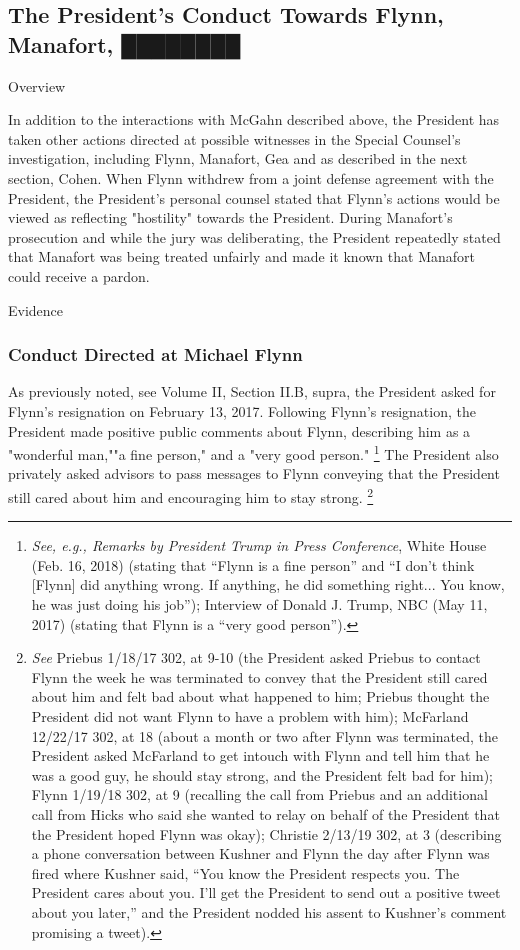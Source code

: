 \subsection{The President's Conduct Towards Flynn, Manafort, ████████}

Overview

In addition to the interactions with McGahn described above, the President has taken other actions directed at possible witnesses in the Special Counsel's investigation, including Flynn, Manafort, Gea and as described in the next section, Cohen.
When Flynn withdrew from a joint defense agreement with the President, the President's personal counsel stated that Flynn's actions would be viewed as reflecting "hostility" towards the President.
During Manafort's prosecution and while the jury was deliberating, the President repeatedly stated that Manafort was being treated unfairly and made it known that Manafort could receive a pardon.

Evidence

\subsubsection{Conduct Directed at Michael Flynn}

As previously noted, see Volume II, Section II.B, supra, the President asked for Flynn's resignation on February 13, 2017.
Following Flynn's resignation, the President made positive public comments about Flynn, describing him as a "wonderful man,""a fine person," and a "very good person."%
\footnote{\textit{See, e.g., Remarks by President Trump in Press Conference}, White House (Feb. 16, 2018) (stating that “Flynn is a fine person” and “I don’t think [Flynn] did anything wrong.
If anything, he did something right... You know, he was just doing his job”);
Interview of Donald J. Trump, NBC (May 11, 2017) (stating that Flynn is a “very good person”).}
The President also privately asked advisors to pass messages to Flynn conveying that the President still cared about him and encouraging him to stay strong.%
\footnote{\textit{See} Priebus 1/18/17 302, at 9-10 (the President asked Priebus to contact Flynn the week he was terminated to convey that the President still cared about him and felt bad about what happened to him;
Priebus thought the President did not want Flynn to have a problem with him);
McFarland 12/22/17 302, at 18 (about a month or two after Flynn was terminated, the President asked McFarland to get intouch with Flynn and tell him that he was a good guy, he should stay strong, and the President felt bad for him);
Flynn 1/19/18 302, at 9 (recalling the call from Priebus and an additional call from Hicks who said she wanted to relay on behalf of the President that the President hoped Flynn was okay);
Christie 2/13/19 302, at 3 (describing a phone conversation between Kushner and Flynn the day after Flynn was fired where Kushner said, “You know the President respects you.
The President cares about you.
I’ll get the President to send out a positive tweet about you later,” and the President nodded his assent to Kushner’s comment promising a tweet).}

